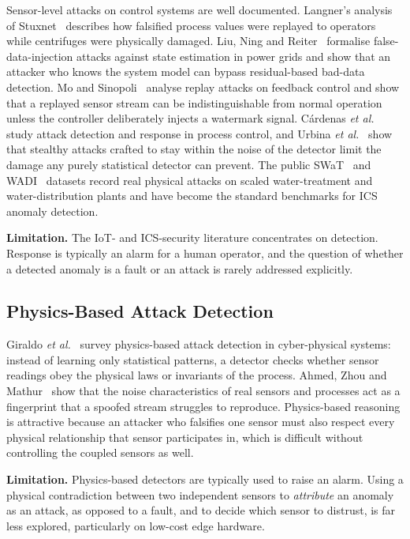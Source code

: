 Sensor-level attacks on control systems are well documented. Langner's analysis of Stuxnet~\cite{langner2011stuxnet} describes how falsified process values were replayed to operators while centrifuges were physically damaged. Liu, Ning and Reiter~\cite{liu2009fdi} formalise false-data-injection attacks against state estimation in power grids and show that an attacker who knows the system model can bypass residual-based bad-data detection. Mo and Sinopoli~\cite{mo2009replay} analyse replay attacks on feedback control and show that a replayed sensor stream can be indistinguishable from normal operation unless the controller deliberately injects a watermark signal. C\'ardenas \emph{et al.}~\cite{cardenas2011attacks} study attack detection and response in process control, and Urbina \emph{et al.}~\cite{urbina2016stealthy} show that stealthy attacks crafted to stay within the noise of the detector limit the damage any purely statistical detector can prevent. The public SWaT~\cite{goh2016swat} and WADI~\cite{ahmed2017wadi} datasets record real physical attacks on scaled water-treatment and water-distribution plants and have become the standard benchmarks for ICS anomaly detection.

\textbf{Limitation.} The IoT- and ICS-security literature concentrates on detection. Response is typically an alarm for a human operator, and the question of whether a detected anomaly is a fault or an attack is rarely addressed explicitly.

\subsection{Physics-Based Attack Detection}

Giraldo \emph{et al.}~\cite{giraldo2018physics} survey physics-based attack detection in cyber-physical systems: instead of learning only statistical patterns, a detector checks whether sensor readings obey the physical laws or invariants of the process. Ahmed, Zhou and Mathur~\cite{ahmed2018noise} show that the noise characteristics of real sensors and processes act as a fingerprint that a spoofed stream struggles to reproduce. Physics-based reasoning is attractive because an attacker who falsifies one sensor must also respect every physical relationship that sensor participates in, which is difficult without controlling the coupled sensors as well.

\textbf{Limitation.} Physics-based detectors are typically used to raise an alarm. Using a physical contradiction between two independent sensors to \emph{attribute} an anomaly as an attack, as opposed to a fault, and to decide which sensor to distrust, is far less explored, particularly on low-cost edge hardware.

